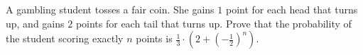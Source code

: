 A gambling student tosses a fair coin. She gains $1$ point for each head that turns up, and gains $2$ points for each tail that turns up. Prove that the probability of the student scoring exactly $n$ points is $\frac{1}{3}\cdot\left(2+\left(-\frac{1}{2}\right)^{n}\right)$.